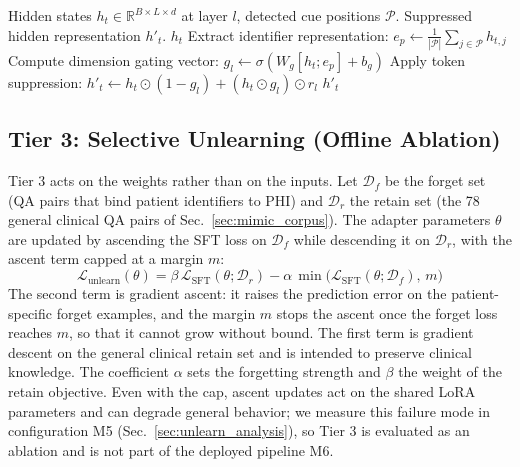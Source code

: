 \documentclass[lettersize,journal]{IEEEtran}
\begin{document}
\begin{algorithm}[!t]
\caption{Tier-2 In-Decoder Attention Suppression Hook}\label{alg:tier2}
\begin{algorithmic}[1]
\REQUIRE Hidden states $h_t \in \mathbb{R}^{B \times L \times d}$ at layer $l$, detected cue positions $\mathcal{P}$.
\ENSURE Suppressed hidden representation $h'_t$.
    \STATE \RETURN $h_t$ 
\ENDIF
\STATE Extract identifier representation: $e_p \leftarrow \frac{1}{|\mathcal{P}|}\sum_{j \in \mathcal{P}} h_{t, j}$
\STATE Compute dimension gating vector: $g_l \leftarrow \sigma(W_g [h_t; e_p] + b_g)$
\STATE Apply token suppression: $h'_t \leftarrow h_t \odot (1 - g_l) + (h_t \odot g_l) \odot r_l$
\STATE \RETURN $h'_t$
\end{algorithmic}
\end{algorithm}

\subsection{Tier 3: Selective Unlearning (Offline Ablation)}
Tier 3 acts on the weights rather than on the inputs. Let $\mathcal{D}_f$ be the forget set (QA pairs that bind patient identifiers to PHI) and $\mathcal{D}_r$ the retain set (the 78 general clinical QA pairs of Sec.~\ref{sec:mimic_corpus}). The adapter parameters $\theta$ are updated by ascending the SFT loss on $\mathcal{D}_f$ while descending it on $\mathcal{D}_r$, with the ascent term capped at a margin $m$:
\begin{equation}
\mathcal{L}_{\mathrm{unlearn}}(\theta) = \beta\,\mathcal{L}_{\mathrm{SFT}}(\theta;\mathcal{D}_r) - \alpha\,\min\bigl(\mathcal{L}_{\mathrm{SFT}}(\theta;\mathcal{D}_f),\, m\bigr)
\label{eq:unlearn}
\end{equation}
The second term is gradient ascent: it raises the prediction error on the patient-specific forget examples, and the margin $m$ stops the ascent once the forget loss reaches $m$, so that it cannot grow without bound. The first term is gradient descent on the general clinical retain set and is intended to preserve clinical knowledge. The coefficient $\alpha$ sets the forgetting strength and $\beta$ the weight of the retain objective. Even with the cap, ascent updates act on the shared LoRA parameters and can degrade general behavior; we measure this failure mode in configuration M5 (Sec.~\ref{sec:unlearn_analysis}), so Tier 3 is evaluated as an ablation and is not part of the deployed pipeline M6.
\end{document}
